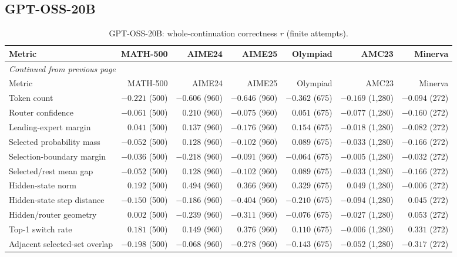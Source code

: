 \subsection{GPT-OSS-20B}
\begingroup\scriptsize\setlength{\tabcolsep}{4pt}
\begin{longtable}{@{}lrrrrrr@{}}
\caption{GPT-OSS-20B: whole-continuation correctness $r$ (finite attempts).}\label{tab:multi-summary-gptoss}\\
\toprule
Metric & MATH-500 & AIME24 & AIME25 & Olympiad & AMC23 & Minerva \\
\midrule\endfirsthead
\multicolumn{7}{l}{\textit{Continued from previous page}}\\
\toprule
Metric & MATH-500 & AIME24 & AIME25 & Olympiad & AMC23 & Minerva \\
\midrule\endhead
\bottomrule\endfoot
Token count & $-0.221$ (500) & $-0.606$ (960) & $-0.646$ (960) & $-0.362$ (675) & $-0.169$ (1,280) & $-0.094$ (272) \\
Router confidence & $-0.061$ (500) & $0.210$ (960) & $-0.075$ (960) & $0.051$ (675) & $-0.077$ (1,280) & $-0.160$ (272) \\
Leading-expert margin & $0.041$ (500) & $0.137$ (960) & $-0.176$ (960) & $0.154$ (675) & $-0.018$ (1,280) & $-0.082$ (272) \\
Selected probability mass & $-0.052$ (500) & $0.128$ (960) & $-0.102$ (960) & $0.089$ (675) & $-0.033$ (1,280) & $-0.166$ (272) \\
Selection-boundary margin & $-0.036$ (500) & $-0.218$ (960) & $-0.091$ (960) & $-0.064$ (675) & $-0.005$ (1,280) & $-0.032$ (272) \\
Selected/rest mean gap & $-0.052$ (500) & $0.128$ (960) & $-0.102$ (960) & $0.089$ (675) & $-0.033$ (1,280) & $-0.166$ (272) \\
Hidden-state norm & $0.192$ (500) & $0.494$ (960) & $0.366$ (960) & $0.329$ (675) & $0.049$ (1,280) & $-0.006$ (272) \\
Hidden-state step distance & $-0.150$ (500) & $-0.186$ (960) & $-0.404$ (960) & $-0.210$ (675) & $-0.094$ (1,280) & $0.045$ (272) \\
Hidden/router geometry & $0.002$ (500) & $-0.239$ (960) & $-0.311$ (960) & $-0.076$ (675) & $-0.027$ (1,280) & $0.053$ (272) \\
Top-1 switch rate & $0.181$ (500) & $0.149$ (960) & $0.376$ (960) & $0.110$ (675) & $-0.006$ (1,280) & $0.331$ (272) \\
Adjacent selected-set overlap & $-0.198$ (500) & $-0.068$ (960) & $-0.278$ (960) & $-0.143$ (675) & $-0.052$ (1,280) & $-0.317$ (272) \\
\end{longtable}\endgroup


